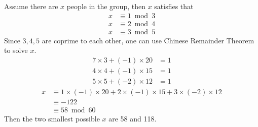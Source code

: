 \documentclass[12pt]{article}
\begin{document}
Assume there are $x$ people in the group, then $x$ satisfies that
\begin{align*}
	x &\equiv 1 \bmod 3\\
	x &\equiv 2 \bmod 4\\
	x &\equiv 3 \bmod 5
\end{align*}
Since $3,4,5$ are coprime to each other, one can use Chinese Remainder Theorem to solve $x$.
\begin{align*}
	7 \times 3 + (-1) \times 20 &= 1\\
	4 \times 4 + (-1) \times 15 &= 1\\
	5 \times 5 + (-2) \times 12 &= 1
\end{align*}
\begin{align*}
	x &\equiv 1 \times (-1) \times 20 + 2 \times (-1) \times 15 + 3 \times (-2) \times 12\\
	&\equiv -122\\
	&\equiv 58 \bmod 60
\end{align*}
Then the two smallest possible $x$ are 58 and 118.
\end{document}
